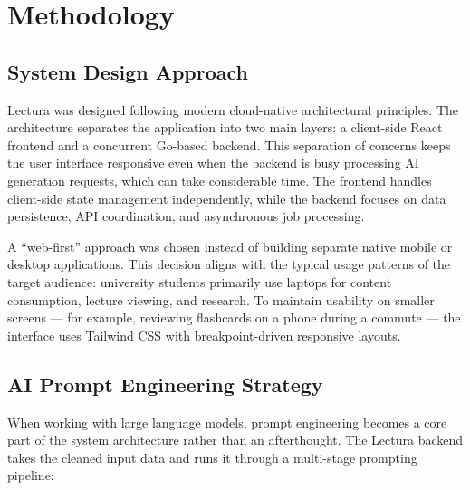 \chapter{Methodology}
\label{chap:methodology}

\section{System Design Approach}
Lectura was designed following modern cloud-native architectural principles. The architecture separates the application into two main layers: a client-side React frontend and a concurrent Go-based backend. This separation of concerns keeps the user interface responsive even when the backend is busy processing AI generation requests, which can take considerable time. The frontend handles client-side state management independently, while the backend focuses on data persistence, API coordination, and asynchronous job processing.

A ``web-first'' approach was chosen instead of building separate native mobile or desktop applications. This decision aligns with the typical usage patterns of the target audience: university students primarily use laptops for content consumption, lecture viewing, and research. To maintain usability on smaller screens — for example, reviewing flashcards on a phone during a commute — the interface uses Tailwind CSS with breakpoint-driven responsive layouts.

\section{AI Prompt Engineering Strategy}
When working with large language models, prompt engineering becomes a core part of the system architecture rather than an afterthought. The Lectura backend takes the cleaned input data and runs it through a multi-stage prompting pipeline:

